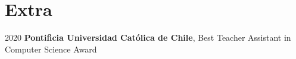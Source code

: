 \section{Extra}
\begin{twocolentry}{
    2020
}
\textbf{Pontificia Universidad Católica de Chile}, Best Teacher Assistant in Computer Science Award
\end{twocolentry} 